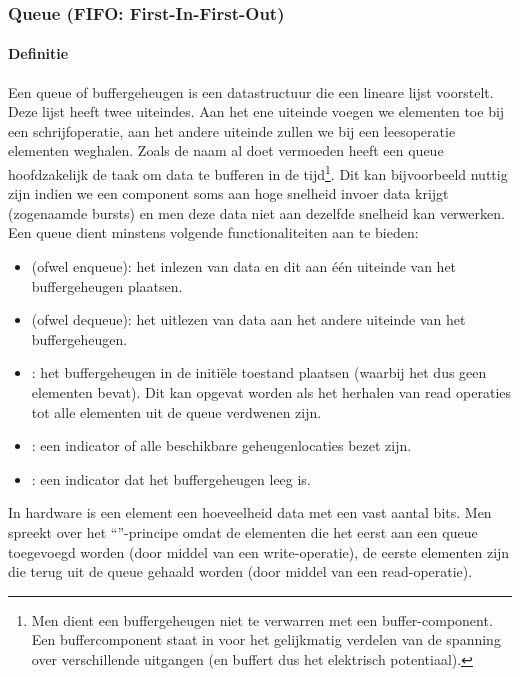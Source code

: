 \subsubsection{Queue (FIFO: First-In-First-Out)}
\paragraph{Definitie}Een queue of buffergeheugen is een datastructuur die een lineare lijst voorstelt. Deze lijst heeft twee uiteindes. Aan het ene uiteinde voegen we elementen toe bij een schrijfoperatie, aan het andere uiteinde zullen we bij een leesoperatie elementen weghalen. Zoals de naam al doet vermoeden heeft een queue hoofdzakelijk de taak om data te bufferen in de tijd\footnote{Men dient een buffergeheugen niet te verwarren met een buffer-component. Een buffercomponent staat in voor het gelijkmatig verdelen van de spanning over verschillende uitgangen (en buffert dus het elektrisch potentiaal).}. Dit kan bijvoorbeeld nuttig zijn indien we een component soms aan hoge snelheid invoer data krijgt (zogenaamde bursts) en men deze data niet aan dezelfde snelheid kan verwerken. Een queue dient minstens volgende functionaliteiten aan te bieden:
\begin{itemize}
 \item {} (ofwel enqueue): het inlezen van data en dit aan \'e\'en uiteinde van het buffergeheugen plaatsen.
 \item {} (ofwel dequeue): het uitlezen van data aan het andere uiteinde van het buffergeheugen.
 \item {}: het buffergeheugen in de initi\"ele toestand plaatsen (waarbij het dus geen elementen bevat). Dit kan opgevat worden als het herhalen van read operaties tot alle elementen uit de queue verdwenen zijn.
 \item {}: een indicator of alle beschikbare geheugenlocaties bezet zijn.
 \item {}: een indicator dat het buffergeheugen leeg is.
\end{itemize}
In hardware is een element een hoeveelheid data met een vast aantal bits. Men spreekt over het ``''-principe omdat de elementen die het eerst aan een queue toegevoegd worden (door middel van een write-operatie), de eerste elementen zijn die terug uit de queue gehaald worden (door middel van een read-operatie).
